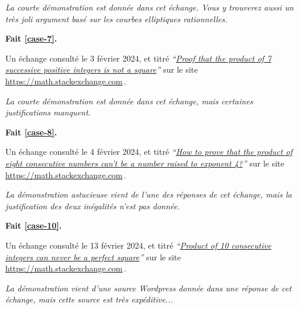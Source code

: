 \smallskip
\noindent
\emph{La courte démonstration est donnée dans cet échange. Vous y trouverez aussi un très joli argument basé sur les courbes elliptiques rationnelles.}




\bigskip
\textbf{Fait \ref{case-7}.}
	
\smallskip
\noindent
Un échange consulté le 3 février 2024, et titré
\emph{\enquote{\href{https://math.stackexchange.com/q/2334887/52365}{Proof that the product of 7 successive positive integers is not a square}}} 
sur le site \url{https://math.stackexchange.com}\,.
	
\smallskip
\noindent
\emph{La courte démonstration est donnée dans cet échange, mais certaines justifications manquent.}




\bigskip
\textbf{Fait \ref{case-8}.}
	
\smallskip
\noindent
Un échange consulté le 4 février 2024, et titré
\emph{\enquote{\href{https://math.stackexchange.com/a/2271715/52365}{How to prove that the product of eight consecutive numbers can't be a number raised to exponent 4?}}} 
sur le site \url{https://math.stackexchange.com}\,.

\smallskip
\noindent
\emph{La démonstration astucieuse vient de l'une des réponses de cet échange, mais la justification des deux inégalités n'est pas donnée.}




\bigskip
\textbf{Fait \ref{case-10}.}
	
\smallskip
\noindent
Un échange consulté le 13 février 2024, et titré
\emph{\enquote{\href{https://math.stackexchange.com/q/2361670/52365}{Product of 10 consecutive integers can never be a perfect square}}} 
sur le site \url{https://math.stackexchange.com}\,.

\smallskip
\noindent
\emph{La démonstration vient d'une source Wordpress donnée dans une réponse de cet échange, mais cette source est très expéditive...}

